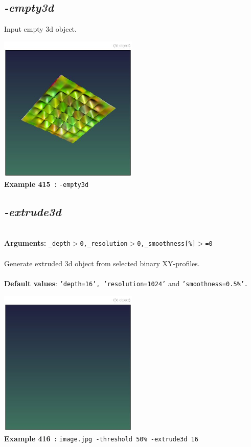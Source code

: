 \documentclass[a4paper,11pt,twoside]{book}
\begin{document}
\subsection{\emph{-empty3d} }\vspace*{-0.5em}
Input empty 3d object.
\begin{center}\includegraphics[keepaspectratio=true,height=7cm,width=\textwidth]{img/gmic_def415.jpg}\\
{\footnotesize \textbf{Example 415~:} \texttt{-empty3d}}
\end{center}

\subsection{\emph{-extrude3d} }\vspace*{-0.5em}
~\\\textbf{Arguments: } 
{\small \texttt{\_depth$>$0,\_resolution$>$0,\_smoothness[\%]$>$=0}}\\~\\
Generate extruded 3d object from selected binary XY-profiles.
~\\~\\\textbf{Default values}: {\small \texttt{'depth=16', 'resolution=1024'} and \texttt{'smoothness=0.5\%'.}}
\begin{center}\includegraphics[keepaspectratio=true,height=7cm,width=\textwidth]{img/gmic_def416.jpg}\\
{\footnotesize \textbf{Example 416~:} \texttt{image.jpg -threshold 50\% -extrude3d 16}}
\end{center}
\end{document}
